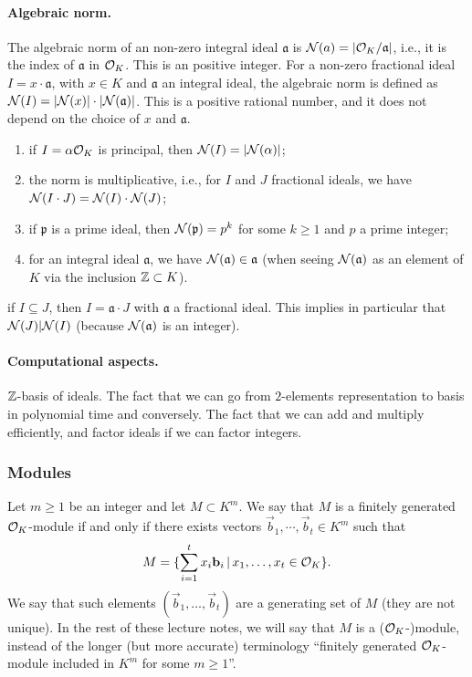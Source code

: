\paragraph{Algebraic norm.} The algebraic norm of an non-zero integral ideal $\mathfrak{a}$ is $\mathcal{N}(a) = |\mathcal{O}_K/\mathfrak{a}|$, i.e., it is the index of $\mathfrak{a}$ in $\mathcal{O}_K$. This is an positive integer. For a non-zero fractional ideal $I = x \cdot \mathfrak{a}$, with $x \in K$ and $\mathfrak{a}$ an integral ideal, the algebraic norm is defined as $\mathcal{N}(I) = |\mathcal{N}(x)| \cdot |\mathcal{N}(\mathfrak{a})|$. This is a positive rational number, and it does not depend on the choice of $x$ and $\mathfrak{a}$.

\begin{properties}
\label{prop:norm-ideal}
\begin{enumerate}
\item if $I = \alpha \mathcal{O}_K$ is principal, then $\mathcal{N}(I) = |\mathcal{N}(\alpha)|$;
\item the norm is multiplicative, i.e., for $I$ and $J$ fractional ideals, we have $\mathcal{N}(I \cdot J) = \mathcal{N}(I) \cdot \mathcal{N}(J)$;
\item if $\mathfrak{p}$ is a prime ideal, then $\mathcal{N}(\mathfrak{p}) = p^k$ for some $k \geq 1$ and $p$ a prime integer;
\item for an integral ideal $\mathfrak{a}$, we have $\mathcal{N}(\mathfrak{a}) \in \mathfrak{a}$ (when seeing $\mathcal{N}(\mathfrak{a})$ as an element of $K$ via the inclusion $\mathbb{Z} \subset K$).
\end{enumerate}
\item if $I \subseteq J$, then $I = \mathfrak{a} \cdot J$ with $\mathfrak{a}$ a fractional ideal. This implies in particular that $\mathcal{N}(J) |\mathcal{N}(I)$ (because $\mathcal{N}(\mathfrak{a})$ is an integer).
\end{properties}


\paragraph{Computational aspects.} $\mathbb{Z}$-basis of ideals. The fact that we can go from $2$-elements representation to basis in polynomial time and conversely. The fact that we can add and multiply efficiently, and factor ideals if we can factor integers.

\subsubsection{Modules}
Let $m \geq 1$ be an integer and let $M \subset K^m$. We say that $M$ is a finitely generated $\mathcal{O}_K$-module if and only if there exists vectors $\vec b_1, \cdots, \vec b_t \in K^m$ such that
\[ M = \{ \sum_{i = 1}^t x_i \mathbf b_i \,|\, x_1, \dots, x_t \in \mathcal{O}_K\}. \]
We say that such elements $(\vec b_1, \dots, \vec b_t)$ are a generating set of $M$ (they are not unique).
In the rest of these lecture notes, we will say that $M$ is a ($\mathcal{O}_K$-)module, instead of the longer (but more accurate) terminology ``finitely generated $\mathcal{O}_K$-module included in $K^m$ for some $m \geq 1$''.

